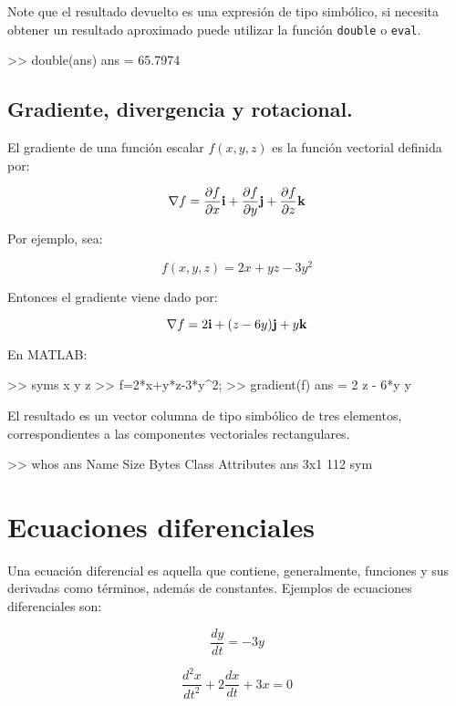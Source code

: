 Note que el resultado devuelto es una expresión de tipo simbólico, si
necesita obtener un resultado aproximado puede utilizar la función
\texttt{double} o \texttt{eval}.

\begin{matlab}
>> double(ans)
ans =
   65.7974
\end{matlab}

\subsection{Gradiente, divergencia y rotacional.}

El gradiente de una función escalar $f(x,y,z)$ es la función vectorial definida por:

$$ \nabla f = \frac{\partial f}{\partial x} {\bf i}+ \frac{\partial f}{\partial y} {\bf j}+ 
\frac{\partial f}{\partial z} {\bf k} $$

Por ejemplo, sea:

$$ f(x,y,z)=2x+yz-3y^2 $$

Entonces el gradiente viene dado por:

$$ \nabla f = 2 {\bf i} + (z-6y) {\bf j} + y {\bf k} $$

En MATLAB:

\begin{matlab}
>> syms x y z
>> f=2*x+y*z-3*y^2; 
>> gradient(f)
ans =
       2
 z - 6*y
       y
\end{matlab}

El resultado es un vector columna de tipo simbólico de tres elementos,
correspondientes a las componentes vectoriales rectangulares.

\begin{matlab}
>> whos ans
  Name      Size            Bytes  Class    Attributes
  ans       3x1               112  sym                
\end{matlab}




\section{Ecuaciones diferenciales}

Una ecuación diferencial es aquella que contiene, generalmente,
funciones y sus derivadas como términos, además de constantes. Ejemplos
de ecuaciones diferenciales son:

$$ 
\frac{dy}{dt}=-3y
$$

$$
\frac{d^2x}{dt^2}+2\frac{dx}{dt}+3x=0 
$$ 